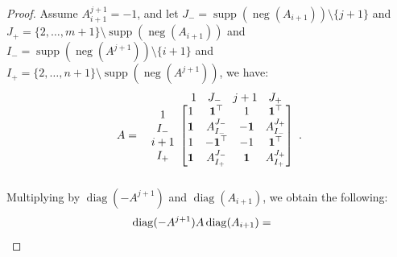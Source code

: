 \documentclass[10pt,a4paper]{amsart}
\DeclareMathOperator{\diag}{diag}
\DeclareMathOperator{\nega}{neg}
\DeclareMathOperator{\supp}{supp}
\begin{document}
\begin{proof}
Assume $A_{i+1}^{j+1}=-1$, and let $J_{-} = \supp(\nega(A_{i+1}))\setminus\{j+1\}$ and $J_{+} = \{2,\ldots,m+1\}\setminus \supp(\nega(A_{i+1}))$ and 
$I_{-} = \supp(\nega(A^{j+1}))\setminus\{i+1\}$ and $I_{+} = \{2,\ldots,n+1\}\setminus \supp(\nega(A^{j+1}))$, we have:
$$A = \begin{array}{c@{}c}
& \begin{array}{cccc}
	1 & J_-& j+1 & J_+
\end{array}\\
\begin{array}{c}
	1\\I_- \\ i+1 \\ I_+
\end{array} &\begin{bmatrix}
	1 & \mathbf{1}^\top & 1 & \mathbf{1}^\top \\
	\mathbf{1} & A_{I_-}^{J_-} & \mathbf{-1} & A_{I_-}^{J_+}\\
	1& \mathbf{-1}^\top &-1&\mathbf{1}^\top\\ 
	\mathbf{1}& A_{I_+}^{J_-} & \mathbf{1} & A_{I_+}^{J_+}
\end{bmatrix}\\&\end{array}.$$
	Multiplying by $\diag(-A^{j+1})$ and $\diag(A_{i+1})$, we obtain the following:
	$$\diag(-A^{j+1})A\diag(A_{i+1}) = \begin{array}{c@{}c}
& \begin{array}{cccc}

\end{array}
\end{array}$$
\end{proof}
\end{document}
